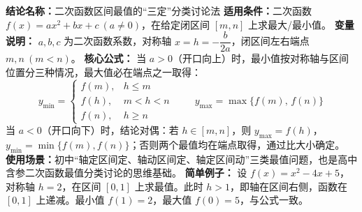 \textbf{结论名称：}二次函数区间最值的“三定”分类讨论法
\textbf{适用条件：}二次函数 \(f(x)=ax^2+bx+c\ (a\neq 0)\)，在给定闭区间 \([m,n]\) 上求最大/最小值。
\textbf{变量说明：} \(a,b,c\) 为二次函数系数，对称轴 \(x=h=-\dfrac{b}{2a}\)，闭区间左右端点 \(m,n\ (m<n)\)。
\textbf{核心公式：} 当 \(a>0\)（开口向上）时，最小值按对称轴与区间位置分三种情况，最大值必在端点之一取得：
\[
\boxed{
y_{\min}=
\begin{cases}
f(m), & h \le m \\[2pt]
f(h), & m < h < n \\[2pt]
f(n), & h \ge n
\end{cases}
}\qquad
\boxed{\,y_{\max}= \max\{f(m),\,f(n)\}\,}
\]
当 \(a<0\)（开口向下）时，结论对偶：若 \(h\in[m,n]\)，则 \(y_{\max}=f(h)\)，\(y_{\min}=\min\{f(m),f(n)\}\)；否则两个最值均在端点取得，通过比大小确定。
\textbf{使用场景：}初中“轴定区间定、轴动区间定、轴定区间动”三类最值问题，也是高中含参二次函数最值分类讨论的思维基础。
\textbf{简单例子：} 设 \(f(x)=x^2-4x+5\)，对称轴 \(h=2\)，在区间 \([0,1]\) 上求最值。此时 \(h>1\)，即轴在区间右侧，函数在 \([0,1]\) 上递减。最小值 \(f(1)=2\)，最大值 \(f(0)=5\)，与公式一致。